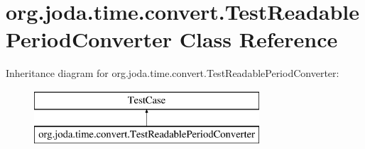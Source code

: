 \hypertarget{classorg_1_1joda_1_1time_1_1convert_1_1_test_readable_period_converter}{\section{org.\-joda.\-time.\-convert.\-Test\-Readable\-Period\-Converter Class Reference}
\label{classorg_1_1joda_1_1time_1_1convert_1_1_test_readable_period_converter}
}
Inheritance diagram for org.\-joda.\-time.\-convert.\-Test\-Readable\-Period\-Converter\-:\begin{figure}[H]
\begin{center}
\leavevmode
\includegraphics[height=2.000000cm]{classorg_1_1joda_1_1time_1_1convert_1_1_test_readable_period_converter}
\end{center}
\end{figure}
